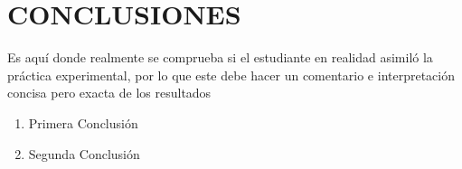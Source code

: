 \chapter*{CONCLUSIONES}

Es aquí donde realmente se comprueba si el estudiante en realidad asimiló la práctica experimental, por lo que este debe hacer un comentario e interpretación concisa pero exacta de los resultados

\begin{enumerate}
\item Primera Conclusi\'on
\item Segunda Conclusi\'on
\end{enumerate}